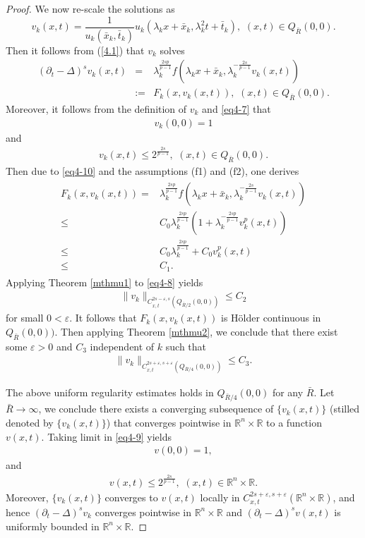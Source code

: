 \documentclass[12pt]{article}
\theoremstyle{remark}
\numberwithin{equation}{section}
\newcommand{\R}{\mathbb{R}}
\begin{document}
\begin{proof}
 We now re-scale the solutions as
 $$
   v_k(x,t)=\frac{1}{u_k(\bar{x}_k, \bar{t}_k)}u_k(\lambda_kx+\bar{x}_k, \lambda_k^2 t + \bar{t}_k), \,\, (x,t) \in Q_{\bar{R}}(0,0).
 $$
Then it follows from (\ref{4.1}) that $v_k$ solves
\begin{eqnarray}\label{eq4-8}
(\partial_t -\Delta)^s v_k(x,t) &=&
\lambda_k^\frac{2sp}{p-1} f(\lambda_kx+\bar{x}_k, \lambda_k^{-\frac{2s}{p-1}}v_k(x,t)) \nonumber \\
&:=&F_k(x, v_k(x,t)),\,\, (x,t)\in Q_{\bar{R}}(0,0).
\end{eqnarray}
Moreover, it follows from the definition of $v_k$ and \eqref{eq4-7} that
\begin{eqnarray}\label{eq4-9}
v_k(0,0)=1
\end{eqnarray}
and
\begin{eqnarray}\label{eq4-10}
v_k(x,t)\leq 2^\frac{2s}{p-1},\,\, (x,t)\in Q_{\bar{R}}(0,0).
\end{eqnarray}
Then due to \eqref{eq4-10} and the assumptions (f1) and (f2),  one derives
\begin{eqnarray*}
\begin{aligned}
F_k(x, v_k(x,t))
=&\lambda_k^\frac{2sp}{p-1} f(\lambda_kx+\bar{x}_k, \lambda_k^{-\frac{2s}{p-1}}v_k(x,t))\\
\leq &C_0\lambda_k^\frac{2sp}{p-1}\left(1+\lambda_k^{-\frac{2sp}{p-1}}v_k^p(x,t)\right)\\
\leq &C_0\lambda_k^\frac{2sp}{p-1}+C_0 v_k^p(x,t)\\
\leq &C_1.
\end{aligned}
\end{eqnarray*}
Applying Theorem \ref{mthmu1} to  \eqref{eq4-8} yields
\begin{eqnarray*}
\|v_k\|_{C_{x,t}^{2s-\varepsilon, s}(Q_{\bar{R}/2}(0,0))} \leq C_2
\end{eqnarray*}
for small $0<\varepsilon.$
It follows that $F_k(x, v_k(x,t))$ is H\"{o}lder continuous
in $Q_{\bar{R}}(0,0)).$ Then applying Theorem \ref{mthmu2}, we conclude that there exist some $\varepsilon >0$
and $C_3$ independent of $k$ such that
\begin{eqnarray}\label{eq4-11}
\|v_k\|_{C_{x,t}^{2s+\varepsilon, s + \varepsilon}(Q_{\bar{R}/4}(0,0))}\leq C_3.
\end{eqnarray}

 The above uniform regularity estimates holds in $Q_{\bar{R}/4}(0,0)$ for any $\bar{R}$. Let $\bar{R} \to \infty$, we conclude there exists
 a converging subsequence of $\{v_k(x,t)\}$ (stilled denoted by $\{v_k(x,t)\}$) that converges pointwise in
 $\mathbb{R}^n \times \R$ to a function $v(x,t).$
Taking limit in \eqref{eq4-9} yields
\begin{eqnarray}\label{eq4-12}
v(0,0)=1,	
\end{eqnarray}
and
\begin{eqnarray}
v(x,t)\leq 2^\frac{2s}{p-1},\,\, (x,t)\in \R^n\times\R.
\end{eqnarray}
 Moreover, $\{v_k(x,t)\}$ converges to $v(x,t)$ locally in $C_{x,t}^{2s+\varepsilon, s + \varepsilon}(\R^n \times \R)$, and hence  $(\partial_t -\Delta)^s v_k$ converges pointwise in $\mathbb{R}^n \times \R$ and $(\partial_t-\Delta)^sv(x,t)$ is uniformly bounded in $\R^n\times\R.$


\end{proof}
\end{document}
